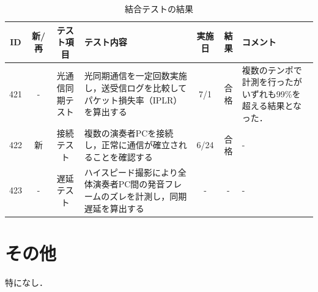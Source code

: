 \documentclass[uplatex,dvipdfmx]{jsarticle}
\begin{document}
\begin{table}[H]
\centering
   \caption{結合テストの結果}
   \label{結合テスト}
\begin{tabular}{|c|c|c|p{5cm}|c|c|p{4cm}|} \hline
   ID&新/ 再&テスト項目 & テスト内容 & 実施日 & 結果 &コメント \\ \hline
   421&-&光通信同期テスト &光同期通信を一定回数実施し，送受信ログを比較してパケット損失率（IPLR）を算出する  & 7/1 & 合格 & 複数のテンポで計測を行ったがいずれも99\%を超える結果となった． \\ \hline
   422&新&接続テスト &  複数の演奏者PCを接続し，正常に通信が確立されることを確認する& 6/24 & 合格 & - \\\hline
   423&-&遅延テスト & ハイスピード撮影により全体演奏者PC間の発音フレームのズレを計測し，同期遅延を算出する & - & - & - \\ \hline
 \end{tabular}
\end{table}



\section{その他}
特になし．
\end{document}
